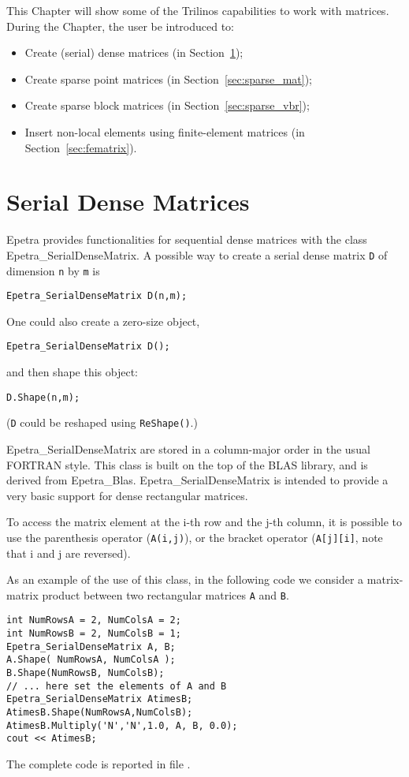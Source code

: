 This Chapter will show some of the Trilinos capabilities to work with
matrices. During the Chapter, the user be introduced to:
\begin{itemize}
\item Create (serial) dense matrices (in Section~\ref{sec:dense_mat});
\item Create sparse point matrices (in Section~\ref{sec:sparse_mat});
\item Create sparse block matrices (in Section~\ref{sec:sparse_vbr});
\item Insert non-local elements using finite-element matrices (in
  Section~\ref{sec:fematrix}).
\end{itemize}


\section{Serial Dense Matrices}
\label{sec:dense_mat}

Epetra provides functionalities for sequential dense matrices with the
class Epetra\_SerialDenseMatrix.  A possible way to create a serial
dense matrix \verb!D! of dimension \verb!n!  by \verb!m! is
\begin{verbatim}
Epetra_SerialDenseMatrix D(n,m);
\end{verbatim}
One could also create a zero-size object, 
\begin{verbatim}
Epetra_SerialDenseMatrix D();
\end{verbatim}
and then shape this object:
\begin{verbatim}
D.Shape(n,m);
\end{verbatim}
({\tt D} could be reshaped using \verb!ReShape()!.)

Epetra\_SerialDenseMatrix are stored in a column-major order in the
usual FORTRAN style. This class is built on the top of the BLAS
library, and is derived from Epetra\_Blas. Epetra\_SerialDenseMatrix is
intended to provide a very basic support for dense rectangular matrices.

\smallskip

To access the matrix element at the i-th row and the j-th column, it is
possible to use the parenthesis operator (\verb!A(i,j)!), or the bracket
operator (\verb!A[j][i]!, note that i and j are reversed).


As an example of the use of this class, in the following code we
consider a matrix-matrix product between two rectangular matrices
\verb!A! and \verb!B!. 
\begin{verbatim}
int NumRowsA = 2, NumColsA = 2;
int NumRowsB = 2, NumColsB = 1;
Epetra_SerialDenseMatrix A, B;
A.Shape( NumRowsA, NumColsA );
B.Shape(NumRowsB, NumColsB);
// ... here set the elements of A and B
Epetra_SerialDenseMatrix AtimesB;
AtimesB.Shape(NumRowsA,NumColsB);  
AtimesB.Multiply('N','N',1.0, A, B, 0.0);
cout << AtimesB;
\end{verbatim}
The complete code is reported in file
.

